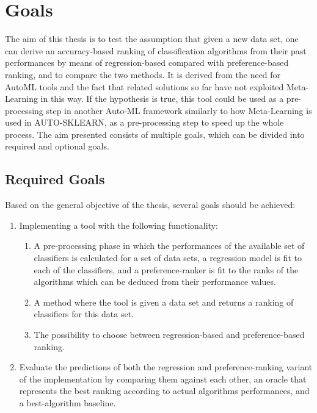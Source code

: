 \documentclass[12pt]{scrartcl}
\begin{document}
\section{Goals}\label{sec:goals}
The aim of this thesis is to test the assumption that given a new data set, one can derive an accuracy-based ranking of classification algorithms from their past performances by means of regression-based compared with preference-based ranking, and to compare the two methods. It is derived from the need for AutoML tools and the fact that related solutions so far have not exploited Meta-Learning in this way. If the hypothesis is true, this tool could be used as a pre-processing step in another Auto-ML framework similarly to how Meta-Learning is used in AUTO-SKLEARN, as a pre-processing step to speed up the whole process. The aim presented consists of multiple goals, which can be divided into required and optional goals.

\subsection{Required Goals}\label{subsec:required_goals}
Based on the general objective of the thesis, several goals should be achieved:

\begin{enumerate}
	\item Implementing a tool with the following functionality:
	\begin{enumerate}
		\item A pre-processing phase in which the performances of the available set of classifiers is calculated for a set of data sets, a regression model is fit to each of the classifiers, and a preference-ranker is fit to the ranks of the algorithms which can be deduced from their performance values.
		\item A method where the tool is given a data set and returns a ranking of classifiers for this data set.
		\item The possibility to choose between regression-based and preference-based ranking.
	\end{enumerate}
	\item Evaluate the predictions of both the regression and preference-ranking variant of the implementation by comparing them against each other, an oracle that represents the best ranking according to actual algorithms performances, and a best-algorithm baseline.
\end{enumerate}

\newpage
\end{document}
